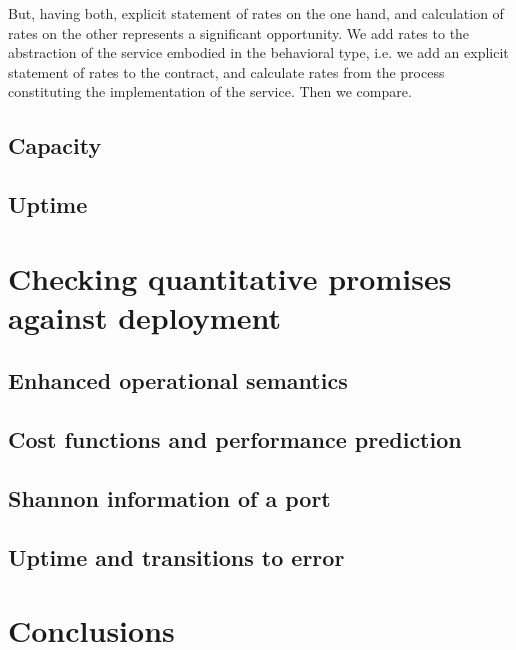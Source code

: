 \documentclass{amsart}
\theoremstyle{definition}
\theoremstyle{remark}
\numberwithin{equation}{subsection}
\begin{document}
But, having both, explicit statement of rates on the one hand, and
calculation of rates on the other represents a significant
opportunity. We add rates to the abstraction of the service embodied
in the behavioral type, i.e. we add an explicit statement of rates to
the contract, and calculate rates from the process constituting the
implementation of the service. Then we compare.

\subsection{Capacity}

\subsection{Uptime}

\section{Checking quantitative promises against deployment}

\subsection{Enhanced operational semantics}

\subsection{Cost functions and performance prediction}

\subsection{Shannon information of a port}

\subsection{Uptime and transitions to error}

\section{Conclusions}



\end{document}
